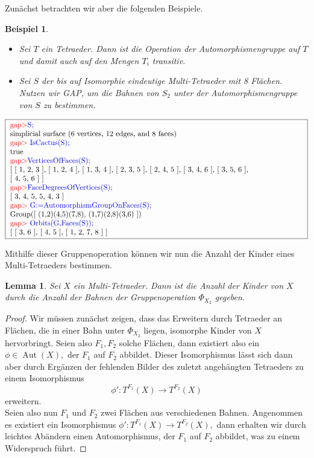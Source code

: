 \documentclass[12pt,titlepage,twoside,cleardoublepage]{article}
\theoremstyle{nummermitklammern}
\newtheorem{lemma}[temp]{Lemma}
\newtheorem{bsp}[temp]{Beispiel}
\newtheorem{lemma}[zahl]{Lemma}
\newtheorem{bsp}[zahl]{Beispiel}
\numberwithin{equation}{section}
\DeclareMathOperator{\Aut}{Aut}
\begin{document}
Zunächst betrachten wir aber die folgenden Beispiele. 
\begin{bsp}
\begin{itemize}
\item Sei $T$ ein Tetraeder. Dann ist die Operation der Automorphismengruppe auf $T$ und damit auch auf den Mengen $T_i$ transitiv.
\item Sei $S$ der bis auf Isomorphie eindeutige Multi-Tetraeder mit 8 Flächen. Nutzen wir GAP, um die Bahnen von $S_2$ unter der Automorphismengruppe von $S$ zu bestimmen.
\end{itemize}
\end{bsp}
\begin{center}
$\fbox{
\parbox{14cm} {
\textcolor{red}{gap$>$}\textcolor{blue}{ S;}\newline
simplicial surface (6 vertices, 12 edges, and 8 faces)\newline
\textcolor{red}{gap$>$} \textcolor{blue}{ IsCactus(S);}\newline
true\newline
\textcolor{red}{gap$>$}\textcolor{blue}{  VerticesOfFaces(S);}\newline
[ [ 1, 2, 3 ], [ 1, 2, 4 ], [ 1, 3, 4 ], [ 2, 3, 5 ], [ 2, 4, 5 ], [ 3, 4, 6 ], [ 3, 5, 6 ],\newline
  [ 4, 5, 6 ] ]\newline
\textcolor{red}{gap$>$}\textcolor{blue}{  FaceDegreesOfVertices(S);}\newline
[ 3, 4, 5, 5, 4, 3 ]\newline
\textcolor{red}{gap$>$} \textcolor{blue}{ G:=AutomorphismGroupOnFaces(S);}\newline
Group([ (1,2)(4,5)(7,8), (1,7)(2,8)(3,6) ])\newline
\textcolor{red}{gap$>$} \textcolor{blue}{ Orbits(G,Faces(S));}\newline
[ [ 3, 6 ], [ 4, 5 ], [ 1, 2, 7, 8 ] ]
}}$
\end{center}
Mithilfe dieser Gruppenoperation können wir nun die Anzahl der Kinder eines Multi-Tetraeders bestimmen.
\begin{lemma}\label{bahn}
Sei $X$ ein Multi-Tetraeder. Dann ist die Anzahl der Kinder von $X$ durch die Anzahl der Bahnen der Gruppenoperation $\Phi_{X_2}$ gegeben.
\end{lemma}
\begin{proof}
Wir müssen zunächst zeigen, dass das Erweitern durch Tetraeder an Flächen, die in einer Bahn unter $\Phi_{X_2}$ liegen, isomorphe Kinder von $X$ hervorbringt. Seien also $F_1,F_2$ solche Flächen, dann existiert also ein $\phi \in \Aut(X),$ der $F_1$ auf $F_2$ abbildet. Dieser Isomorphismus lässt sich dann aber durch Ergänzen der fehlenden Bilder des zuletzt angehängten Tetraeders zu einem Isomorphismus 
\[
\phi':T^{F_1}(X)\to T^{F_2}(X)
\]
 erweitern. \\
 Seien also nun $F_1$ und $F_2$ zwei Flächen aus verschiedenen Bahnen. Angenommen es existiert ein Isomorphismus $\phi':T^{F_1}(X)\to T^{F_2}(X),$ dann erhalten wir durch leichtes Abändern einen Automorphismus, der $F_1$ auf $F_2$ abbildet, was zu einem Widerspruch führt. 
\end{proof}
\end{document}
